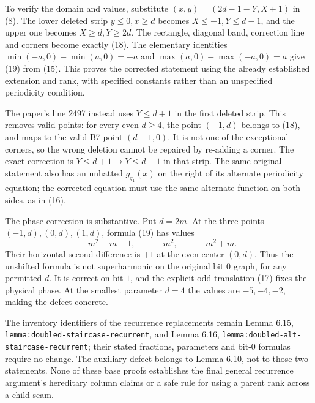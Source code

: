 \documentclass[11pt]{article}
\begin{document}
To verify the domain and values, substitute
$(x,y)=(2d-1-Y,X+1)$ in (8). The lower deleted strip
$y\le0,x\ge d$ becomes $X\le-1,Y\le d-1$, and the upper one
becomes $X\ge d,Y\ge2d$. The rectangle, diagonal band, correction
line and corners become exactly (18). The elementary identities
$\min(-a,0)-\min(a,0)=-a$ and
$\max(a,0)-\max(-a,0)=a$ give (19) from (15).
This proves the corrected statement using the already established
extension and rank, with specified constants rather than an unspecified
periodicity condition.

The paper's line 2497 instead uses $Y\le d+1$ in the first deleted
strip. This removes valid points: for every even $d\ge4$, the point
$(-1,d)$ belongs to (18), and maps to the valid B7 point $(d-1,0)$.
It is not one of the exceptional corners, so the wrong deletion cannot
be repaired by re-adding a corner. The exact correction is
$Y\le d+1\longrightarrow Y\le d-1$ in that strip.
The same original statement also has an unhatted $g_{q_1}(x)$ on the
right of its alternate periodicity equation; the corrected equation
must use the same alternate function on both sides, as in (16).

The phase correction is substantive. Put $d=2m$. At the three points
$(-1,d),(0,d),(1,d)$, formula (19) has values
\[
 -m^2-m+1,\qquad -m^2,\qquad -m^2+m.
\]
Their horizontal second difference is $+1$ at the even center $(0,d)$.
Thus the unshifted formula is not superharmonic on the original bit $0$
graph, for any permitted $d$. It is correct on bit $1$, and the explicit
odd translation (17) fixes the physical phase. At the smallest parameter
$d=4$ the values are $-5,-4,-2$, making the defect concrete.

\begin{sloppypar}
The inventory identifiers of the recurrence replacements remain
Lemma 6.15, \texttt{lemma:doubled-staircase-recurrent}, and Lemma 6.16,
\texttt{lemma:doubled-alt-staircase-recurrent}; their stated fractions,
parameters and bit-$0$ formulas require no change. The auxiliary defect
belongs to Lemma 6.10, not to those two statements. None of these base
proofs establishes the final general recurrence argument's hereditary
column claims or a safe rule for using a parent rank across a child seam.
\end{sloppypar}
\end{document}
